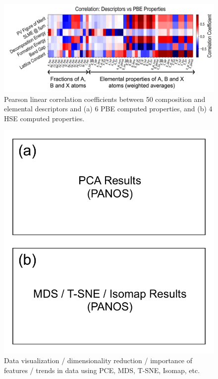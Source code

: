 \documentclass[twoside,twocolumn,9pt]{article}
\begin{document}
\begin{figure}[h]
\centering
\includegraphics[width=0.99\linewidth]{Figure4.png}
\caption{\label{Fig:outline} 
Pearson linear correlation coefficients between 50 composition and elemental descriptors and (a) 6 PBE computed properties, and (b) 4 HSE computed properties.}
\end{figure}


\begin{figure}[h]
\centering
\includegraphics[width=0.80\linewidth]{Figure5.pdf}
\caption{\label{Fig:outline} 
Data visualization / dimensionality reduction / importance of features / trends in data using PCE, MDS, T-SNE, Isomap, etc.}
\end{figure}
\end{document}
